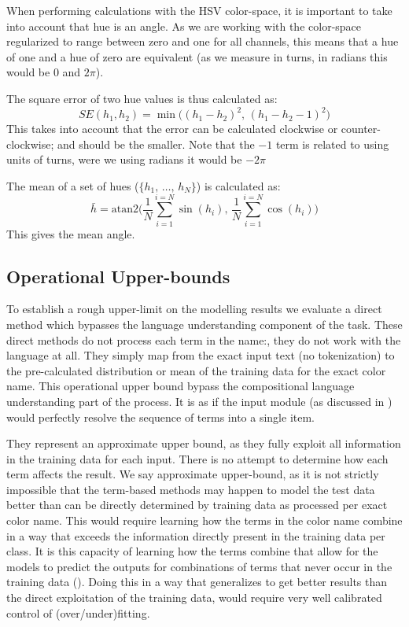 \documentclass[]{book}
\begin{document}
When performing calculations with the HSV color-space, it is important to take into account that hue is an angle.
As we are working with the color-space regularized to range between zero and one for all channels,
this means that a hue of one and a hue of zero are equivalent (as we measure in turns, in radians this would be $0$ and $2\pi$).

The square error of two hue values is thus calculated as:
\begin{equation}
SE(h_1, h_2) = \min \big( \left(h_1 - h_2 \right)^2, \, \left(h_1 - h_2 -1 \right)^2  \big)
\end{equation}
This takes into account that the error can be calculated clockwise or counter-clockwise; and should be the smaller.
Note that the $-1$ term is related to using units of turns, were we using radians it would be $-2\pi$


The mean of a set of hues ($\lbrace h_1,\,\ldots,\,h_N \rbrace$) is calculated as:
\begin{equation}
\bar h = \mathrm{atan2} \Bigg(%
	\frac{1}{N} \sum_{i=1}^{i=N} \sin (h_i), \,  %
	\frac{1}{N} \sum_{i=1}^{i=N} \cos (h_i)%
\Bigg)%
\end{equation}
This gives the mean angle.



\subsection{Operational Upper-bounds}
To establish a rough upper-limit on the modelling results we evaluate a direct method which bypasses the language understanding component of the task.
These direct methods do not process each term in the name:, they do not work with the language at all.
They simply map from the exact input text (no tokenization) to the pre-calculated distribution or mean of the training data for the exact color name.
This operational upper bound bypass the compositional language understanding part of the process.
It is as if the input module (as discussed in ) would perfectly resolve the sequence of terms into a single item.


They represent an approximate upper bound, as they fully exploit all information in the training data for each input.
There is no attempt to determine how each term affects the result.
We say approximate upper-bound, as it is not strictly impossible that the term-based methods may happen to model the test data better than can be directly determined by training data as processed per exact color name.
This would require learning how the terms in the color name combine in a way that exceeds the information directly present in the training data per class.
It is this capacity of learning how the terms combine that allow for the models to predict the outputs for combinations of terms that never occur in the training data ().
Doing this in a way that generalizes to get better results than the direct exploitation of the training data, would require very well calibrated control of (over/under)fitting.
\end{document}
